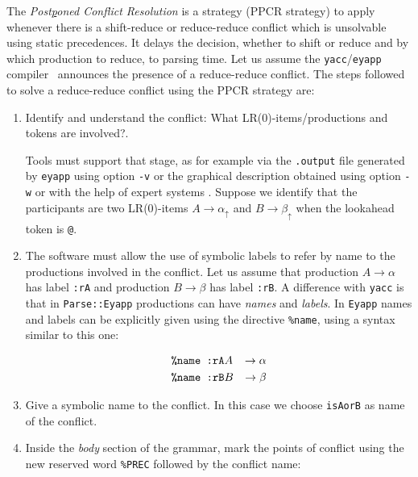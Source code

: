 
The {\it Post\underline{p}oned Conflict Resolution} is a strategy (PPCR strategy)
to apply whenever there is a shift-reduce or reduce-reduce conflict which is
unsolvable using static precedences. It delays the decision, whether to shift
or reduce and by which production to reduce, to parsing time.
Let us assume the \verb|yacc|/\verb|eyapp| \mbox{compiler \cite{Rodriguez:Leon}}
announces  the presence of
a reduce-reduce conflict.
The steps followed to solve a reduce-reduce conflict using the
PPCR strategy are:

\begin{enumerate}
\item
Identify and understand the conflict: What LR(0)-items/productions and tokens are involved?.

Tools must support that stage, as for example via  the \verb|.output| file generated by \verb|eyapp| 
using option \verb|-v| or the graphical description obtained using option \verb|-w| or 
with the help of expert systems \cite{passos,basten}.
Suppose  we identify that the participants are two LR(0)-items \mbox{$A \rightarrow \alpha_\uparrow$}
and
$B \rightarrow \beta_\uparrow$ when the lookahead token is \verb|@|.

\item The software must allow the use of symbolic labels to refer
by name to the productions involved in the conflict.
Let us assume that production $A \rightarrow \alpha$
has label \texttt{:rA} and production $B \rightarrow \beta$
has label \texttt{:rB}.
A difference with \verb|yacc| is that
in \verb|Parse::Eyapp| productions can have {\it names} and {\it labels}.
In \verb|Eyapp| names and labels can be
explicitly given using the directive \verb|%name|, using a syntax similar to this one:

\begin{eqnarray*}
\mbox{{\tt \%name :rA}}& A &\rightarrow \alpha\\
\mbox{{\tt \%name :rB}}& B &\rightarrow \beta 
\end{eqnarray*}


\item
Give a symbolic name to the conflict. In this case we choose \verb|isAorB|
as name of the conflict.

\item
\label{item:mark}
Inside the {\it body} section of the grammar, mark the points of conflict using the
new reserved word \verb|%PREC| followed by the conflict name:


\end{enumerate}
